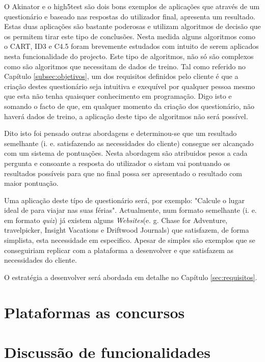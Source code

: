 O Akinator\cite{akinator} e o high5test\cite{5} são dois bons exemplos de aplicações que através de um questionário e baseado nas respostas do utilizador final, apresenta um resultado. Estas duas aplicações são bastante poderosas e utilizam algoritmos de decisão que os permitem tirar este tipo de conclusões. Nesta medida alguns algoritmos como o CART\cite{cart}, ID3\cite{id3}\cite{id3_2}\cite{cart} e C4.5\cite{cart}\cite{c4.5} foram brevemente estudados com intuito de serem aplicados nesta funcionalidade do projecto. Este tipo de algoritmos, não só são complexos como são algoritmos que necessitam de dados de treino. Tal como referido no Capítulo \ref{subsec:objetivos}, um dos requisitos definidos pelo cliente é que a criação destes questionário seja intuitiva e exequível por qualquer pessoa mesmo que esta não tenha quaisquer conhecimento em programação. Digo isto e somando o facto de que, em qualquer momento da criação dos questionário, não haverá dados de treino, a aplicação deste tipo de algoritmos não será possível.

Dito isto foi pensado outras abordagens e determinou-se que um resultado semelhante (i. e. satisfazendo as necessidades do cliente) consegue ser alcançado com um sistema de pontuações. Nesta abordagem são atribuidos pesos a cada pergunta e consoante a resposta do utilizador o sistam vai pontuando os resultados possíveis para que no final possa ser apresentado o resultado com maior pontuação.

Uma aplicação deste típo de questionário será, por exemplo: "Calcule o lugar ideal de para viajar nas suas férias". Actualmente, num formato semelhante (i. e. em formato \textit{quiz}) já existem alguns \textit{Websites}(e. g. Chase for Adventure\cite{chaseforadventure}, travelpicker\cite{travelpicker}, Insight Vacations\cite{insightvacations} e Driftwood Journals\cite{driftwoodjournals}) que satisfazem, de forma simplista, esta necessidade em especifico. Apesar de simples são exemplos que se conseguiriam replicar com a plataforma a desenvolver e que satisfazem as necessidades do cliente. 

O estratégia a desenvolver será abordada em detalhe no Capítulo \ref{sec:requisitos}.
\section{Plataformas as concursos}


\section{Discussão de funcionalidades}
\label{comparacao}

